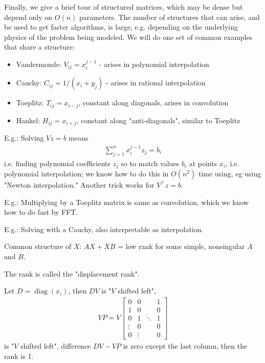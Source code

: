 \documentclass[11pt]{article}
\numberwithin{equation}{section}
\begin{document}
Finally, we give a brief tour of structured matrices, which may be dense but depend only on $O(n)$ parameters. The number of structures that can arise, 
and be used to get faster algorithms, is large, e.g. depending on the underlying physics of the problem being modeled.
We will do one set of common examples that share a structure:\begin{itemize}
    \item Vandermonde: $V_{ij} = x_i^{j-1}$ - arises in polynomial interpolation
    \item Cauchy: $C_{ij} = 1/(x_i+y_j)$ - arises in rational interpolation
    \item Toeplitz: $T_{ij} = x_{i-j}$, constant along diagonals, arises in convolution
    \item Hankel: $H_{ij} = x_{i+j}$, constant along "anti-diagonals", similar to Toeplitz
\end{itemize}

E.g.: Solving $Vz = b$ means \begin{align*}
    \sum_{j=1}^n x_i^{j-1} z_j = b_i
\end{align*} i.e. finding polynomial coefficients $z_j$ so to match values $b_i$ at points $x_i$, i.e. polynomial interpolation; 
we know how to do this in $O(n^2)$ time using, eg using "Newton interpolation." Another trick works for $V^\top z = b$.

E.g.: Multiplying by a Toeplitz matrix is same as convolution, which we know how to do fast by FFT.

E.g.: Solving with a Cauchy, also interpretable as interpolation.

Common structure of $X$: $AX + XB$ = low rank for some simple, nonsingular $A$ and $B$.

\begin{definition}
    The rank is called the "displacement rank".
\end{definition}

\begin{example}
    Let $D = \operatorname{diag}(x_i)$, then $DV$ is "$V$ shifted left",
    \begin{align*}
        V P = V \left[\begin{array}{llll}
            0 & 0 & & 1 \\
            1 & 0 & & 0 \\
            0 & 1 & \ddots & 1 \\
            \vdots & 0 & & 0 \\
            0 & \vdots & & 0
            \end{array}\right]
    \end{align*} is "$V$ shifted left",
    difference $DV - VP$ is zero except the last column, then the rank is 1.  
\end{example}
\end{document}
